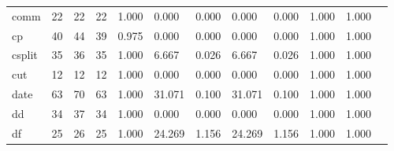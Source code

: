 \begin{longtable}{lp{1.00cm}p{1.00cm}p{1.00cm}p{1.00cm}p{1.00cm}p{1.00cm}p{1.00cm}p{1.00cm}p{1.00cm}p{1.00cm}p{1.00cm}}
comm      &                           22 &                 22 &                                22 &                                      1.000 &                                  0.000 &                                        0.000 &                             0.000 &                                   0.000 &                        1.000 &                                        1.000 \\
cp        &                           40 &                 44 &                                39 &                                      0.975 &                                  0.000 &                                        0.000 &                             0.000 &                                   0.000 &                        1.000 &                                        1.000 \\
csplit    &                           35 &                 36 &                                35 &                                      1.000 &                                  6.667 &                                        0.026 &                             6.667 &                                   0.026 &                        1.000 &                                        1.000 \\
cut       &                           12 &                 12 &                                12 &                                      1.000 &                                  0.000 &                                        0.000 &                             0.000 &                                   0.000 &                        1.000 &                                        1.000 \\
date      &                           63 &                 70 &                                63 &                                      1.000 &                                 31.071 &                                        0.100 &                            31.071 &                                   0.100 &                        1.000 &                                        1.000 \\
dd        &                           34 &                 37 &                                34 &                                      1.000 &                                  0.000 &                                        0.000 &                             0.000 &                                   0.000 &                        1.000 &                                        1.000 \\
df        &                           25 &                 26 &                                25 &                                      1.000 &                                 24.269 &                                        1.156 &                            24.269 &                                   1.156 &                        1.000 &                                        1.000 \\

\end{longtable}
